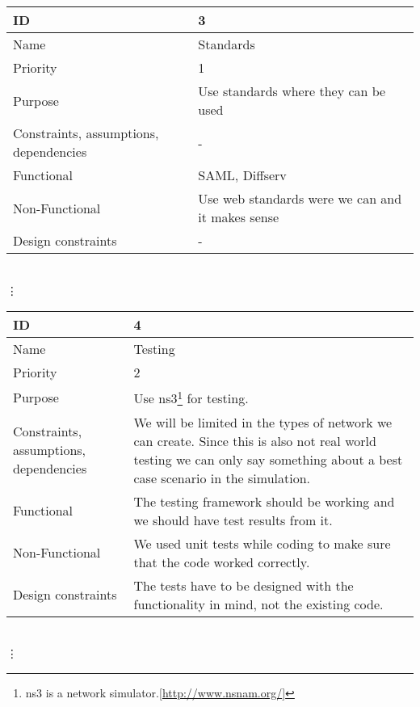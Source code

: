 \begin{tabular}{| p{4cm} | p{8cm} |}
    \hline
    ID & 3 \\
    \hline
    Name & Standards \\
    \hline
    Priority & 1 \\
    \hline
    Purpose & Use standards where they can be used \\
    \hline 
    Constraints, assumptions, dependencies & -\\
    \hline  
    Functional & SAML, Diffserv \\
    \hline
    Non-Functional & Use web standards were we can and it makes sense \\ 
    \hline
    Design constraints & - \\
    \hline
\end{tabular}
\\  \vdots  \\

\begin{tabular}{| p{4cm} | p{8cm} |}
    \hline
    ID & 4 \\
    \hline
    Name & Testing  \\
    \hline
    Priority & 2 \\
    \hline
    Purpose & Use \gls{ns3}\footnote{\gls{ns3} is a network simulator.[\url{http://www.nsnam.org/}]} for testing. \\
    \hline 
    Constraints, assumptions, dependencies & We will be limited in the types of network we can create. Since this is also not real world testing we can only say something about a best case scenario in the simulation.\\
    \hline  
    Functional & The testing framework should be working and we should have test results from it.\\
    \hline
    Non-Functional & We used unit tests while coding to make sure that the code worked correctly. \\ 
    \hline
    Design constraints & The tests have to be designed with the functionality in mind, not the existing code. \\
    \hline
\end{tabular}
\\  \vdots  \\

